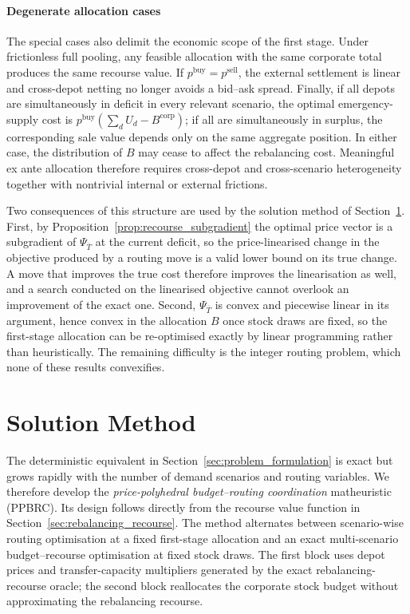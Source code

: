 \documentclass[authoryear,final,3p,times]{elsarticle}
\theoremstyle{definition}
\theoremstyle{plain}
\begin{document}
\paragraph{Degenerate allocation cases}
The special cases also delimit the economic scope of the first stage.  Under
frictionless full pooling, any feasible allocation with the same corporate
total produces the same recourse value.  If
$p^{\mathrm{buy}}=p^{\mathrm{sell}}$, the external settlement is linear and
cross-depot netting no longer avoids a bid--ask spread.  Finally, if all depots
are simultaneously in deficit in every relevant scenario, the optimal
emergency-supply cost is
$p^{\mathrm{buy}}(\sum_dU_d-B^{\mathrm{corp}})$; if all are simultaneously in
surplus, the corresponding sale value depends only on the same aggregate
position.  In either case, the distribution of $B$ may cease to affect the
rebalancing cost.  Meaningful ex ante allocation therefore requires
cross-depot and cross-scenario heterogeneity together with nontrivial internal
or external frictions.



Two consequences of this structure are used by the solution method of
Section~\ref{sec:methodology}.  First, by
Proposition~\ref{prop:recourse_subgradient} the optimal price vector is a
subgradient of $\Psi_{\overline T}$ at the current deficit, so the
price-linearised change in the objective produced by a routing move is a
valid lower bound on its true change. A move that improves the true cost
therefore improves the linearisation as well, and a search conducted on the
linearised objective cannot overlook an improvement of the exact one.  Second, $\Psi_{\overline T}$ is convex and piecewise linear in
its argument, hence convex in the allocation $B$ once stock draws are fixed,
so the first-stage allocation can be re-optimised exactly by linear
programming rather than heuristically.  The remaining difficulty is the
integer routing problem, which none of these results convexifies.

\section{Solution Method}
\label{sec:methodology}

The deterministic equivalent in Section~\ref{sec:problem_formulation} is exact but grows rapidly with the number of demand scenarios and routing variables. We therefore develop the \emph{price-polyhedral budget--routing coordination} matheuristic (PPBRC). Its design follows directly from the recourse value function in Section~\ref{sec:rebalancing_recourse}. The method alternates between scenario-wise routing optimisation at a fixed first-stage allocation and an exact multi-scenario budget--recourse optimisation at fixed stock draws. The first block uses depot prices and transfer-capacity multipliers generated by the exact rebalancing-recourse oracle; the second block reallocates the corporate stock budget without approximating the rebalancing recourse.
\end{document}
